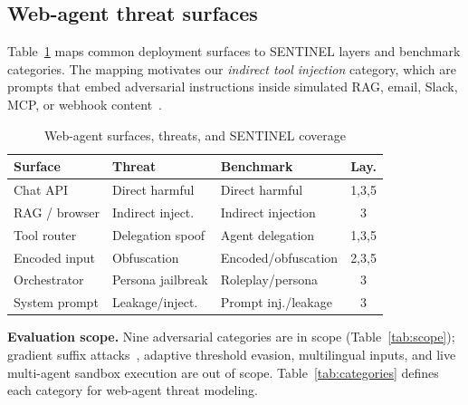 \documentclass[conference]{IEEEtran}
\newcommand{\tablestretch}{1.18}
\newcommand{\tablesetup}{\small\renewcommand{\arraystretch}{\tablestretch}\setlength{\tabcolsep}{4pt}}
\begin{document}
\subsection{Web-agent threat surfaces}

Table~\ref{tab:webagent} maps common deployment surfaces to SENTINEL layers and
benchmark categories.
The mapping motivates our \emph{indirect tool injection} category, which are prompts that
embed adversarial instructions inside simulated RAG, email, Slack, MCP, or
webhook content~\cite{greshake2023not}.

\begin{table}[t]
\centering
\tablesetup
\caption{Web-agent surfaces, threats, and SENTINEL coverage}
\label{tab:webagent}
\begin{tabularx}{\columnwidth}{@{}>{\raggedright\arraybackslash}X >{\raggedright\arraybackslash}X >{\raggedright\arraybackslash}X c@{}}
\toprule
\rowcolor{headerblue!14}
\textbf{Surface} & \textbf{Threat} & \textbf{Benchmark} & \textbf{Lay.} \\
\midrule
Chat API       & Direct harmful    & Direct harmful      & 1,3,5 \\
RAG / browser  & Indirect inject.  & Indirect injection  & 3 \\
Tool router    & Delegation spoof  & Agent delegation    & 1,3,5 \\
Encoded input  & Obfuscation       & Encoded/obfuscation & 2,3,5 \\
Orchestrator   & Persona jailbreak & Roleplay/persona    & 3 \\
System prompt  & Leakage/inject.   & Prompt inj./leakage & 3 \\
\bottomrule
\end{tabularx}
\end{table}

\textbf{Evaluation scope.}
Nine adversarial categories are in scope (Table~\ref{tab:scope}); gradient
suffix attacks~\cite{zou2023universal}, adaptive threshold evasion, multilingual
inputs, and live multi-agent sandbox execution are out of scope.
Table~\ref{tab:categories} defines each category for web-agent threat modeling.
\end{document}
